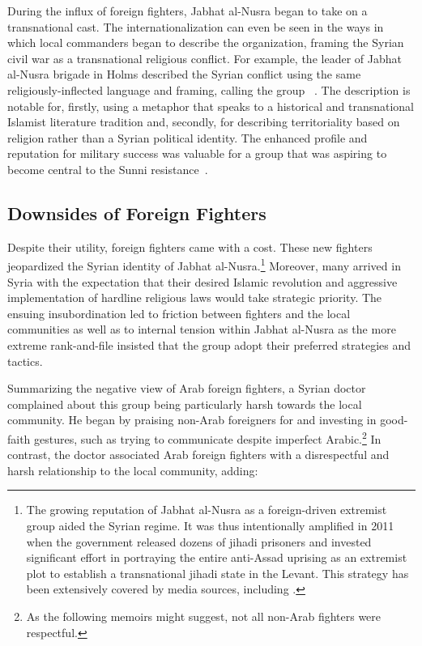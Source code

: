 During the influx of foreign fighters, Jabhat al-Nusra began to take on a transnational cast. The internationalization can even be seen in the ways in which local commanders began to describe the organization, framing the Syrian civil war as a transnational religious conflict.  For example, the leader of Jabhat al-Nusra brigade in Holms described the Syrian conflict using the same religiously-inflected language and framing, calling the group ~\autocite{sherlock2012inside}. The description is notable for, firstly, using a metaphor that speaks to a historical and transnational Islamist literature tradition and, secondly, for describing territoriality based on religion rather than a Syrian political identity. The enhanced profile and reputation for military success was valuable for a group that was aspiring to become central to the Sunni resistance~\autocite{lister2016profiling, bbc2016jfs}.
\subsection{Downsides of Foreign Fighters}

Despite their utility, foreign fighters came with a cost. These new fighters jeopardized the Syrian identity of Jabhat al-Nusra\autocite{adraoui2019case}.\footnote{The growing reputation of Jabhat al-Nusra as a foreign-driven extremist group aided the Syrian regime. It was thus intentionally amplified in 2011 when the government released dozens of jihadi prisoners and invested significant effort in portraying the entire anti-Assad uprising as an extremist plot to establish a transnational jihadi state in the Levant. This strategy has been extensively covered by media sources, including \autocite{salloum2013jail, weiss2016isis}.}  Moreover, many arrived in Syria with the expectation that their desired Islamic revolution and aggressive implementation of hardline religious laws would take strategic priority.  The ensuing insubordination led to friction between fighters and the local communities as well as to internal tension within Jabhat al-Nusra as the more extreme rank-and-file insisted that the group adopt their preferred strategies and tactics.

Summarizing the negative view of Arab foreign fighters, a Syrian doctor complained about this group being particularly harsh towards the local community.  He began by praising non-Arab foreigners for  and investing in good-faith gestures, such as trying to communicate despite imperfect Arabic.\footnote{As the following memoirs might suggest, not all non-Arab fighters were respectful.} In contrast, the doctor associated Arab foreign fighters with a disrespectful and harsh relationship to the local community, adding: 

